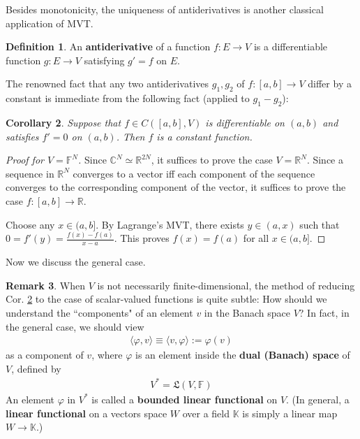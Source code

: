 \documentclass[12pt,b5paper,notitlepage]{article}
\theoremstyle{definition}
\newtheorem{df}{Definition}[section]
\newtheorem{rem}[df]{Remark}
\theoremstyle{plain}
\newtheorem{co}[df]{Corollary}
\newcommand{\fk}{\mathfrak}
\newcommand{\bk}[1]{\langle {#1}\rangle}
\newcommand{\Kbb}{\mathbb K}
\newcommand{\Cbb}{\mathbb C}
\newcommand{\Rbb}{\mathbb R}
\newcommand{\Fbb}{\mathbb F}
\newcommand{\dps}{\displaystyle}
\numberwithin{equation}{section}
\begin{document}
Besides monotonicity, the uniqueness of antiderivatives is another classical application of MVT.

\begin{df}
An \textbf{antiderivative}  of a function $f:E\rightarrow V$ is a differentiable function $g:E\rightarrow V$ satisfying $g'=f$ on $E$.
\end{df}

The renowned fact that any two antiderivatives $g_1,g_2$ of $f:[a,b]\rightarrow V$ differ by a constant is immediate from the following fact (applied to $g_1-g_2$):

\begin{co}\label{lb326}
Suppose that $f\in C([a,b],V)$ is differentiable on $(a,b)$ and satisfies $f'=0$ on $(a,b)$. Then $f$ is a constant function.
\end{co}

\begin{proof}[Proof for $V=\Fbb^N$]
Since $\Cbb^N\simeq\Rbb^{2N}$, it suffices to prove the case $V=\Rbb^N$. Since a sequence in $\Rbb^N$ converges to a vector iff each component of the sequence converges to the corresponding component of the vector, it suffices to prove the case $f:[a,b]\rightarrow\Rbb$.  

Choose any $x\in(a,b]$. By Lagrange's MVT, there exists $y\in(a,x)$ such that $\dps 0=f'(y)=\frac{f(x)-f(a)}{x-a}$. This proves $f(x)=f(a)$ for all $x\in(a,b]$.
\end{proof}


Now we discuss the general case. 

\begin{rem}
When $V$ is not necessarily finite-dimensional, the method of reducing Cor. \ref{lb326} to the case of scalar-valued functions is quite subtle: How should we understand the ``components" of an element $v$ in the Banach space $V$? In fact, in the general case, we should view
\begin{align*}
\bk{\varphi,v}\equiv\bk{v,\varphi}:=\varphi(v)
\end{align*}
as a component of $v$, where $\varphi$ is an element inside the \textbf{dual (Banach) space}  of $V$, defined by 
\begin{align}
V^*=\fk L(V,\Fbb)
\end{align}
An element $\varphi$ in $V^*$ is called a \textbf{bounded linear functional} on $V$.  (In general, a \textbf{linear functional}  on a vectors space $W$ over a field $\Kbb$ is simply a linear map $W\rightarrow\Kbb$.)
\end{rem}
\end{document}
